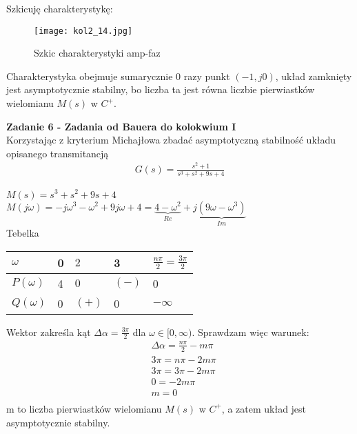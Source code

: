 \documentclass[a4paper,11pt]{article}
\begin{document}
Szkicuję charakterystykę:
\begin{figure}[H]
\centerline{\texttt{[image: kol2\_14.jpg]}}
\caption{Szkic charakterystyki amp-faz}
\label{fig:kol2_14}
\end{figure}
Charakterystyka obejmuje sumarycznie 0 razy punkt \( ( -1, j0 ) \), układ zamknięty jest asymptotycznie stabilny, bo liczba ta jest równa liczbie pierwiastków wielomianu \( M(s) \) w \( C^+ \).

\newpage
\begin{framed}
\textbf{Zadanie 6 - Zadania od Bauera do kolokwium I } \\ 
Korzystając z kryterium Michajłowa zbadać asymptotyczną stabilność układu opisanego transmitancją
\begin{align*}
G(s)=\frac{s^{2}+1}{s^{3}+s^{2}+9s+4}
\end{align*}
\end{framed}

$M(s)=s^3+s^2+9s+4$\\
$M(j\omega)=-j\omega^3-\omega^2+9j\omega+4=\underbrace{4-\omega^2}_{Re}+j\underbrace{(9\omega -\omega ^{3})}_{Im}$\\
Tebelka
\begin{table}[H]
\begin{center}
\begin{tabular}{|p{2cm}|p{2cm}|p{2cm}|p{2cm}|p{2cm}|}
\hline
\( \omega \) & 0 & \( 2 \) & 3 & \( \frac{n\pi}{2}=\frac{3\pi}{2} \) \\ \hline
\( P(\omega) \) & 4 & \( 0  \) & \( (-) \) &  0  \\ \hline
\( Q(\omega) \) & 0 & \( (+) \) & 0 & \( -\infty \)  \\ \hline
\end{tabular}
\end{center}
\end{table}

\begin{figure}[!h]
\end{figure}
Wektor zakreśla kąt \( \Delta \alpha = \frac{3\pi}{2} \) dla \( \omega \in [0, \infty ) \). Sprawdzam więc warunek:
\begin{align*}
&\Delta \alpha = \frac{n\pi}{2}-m\pi \\
&3\pi = n\pi-2m\pi \\
&3\pi =3\pi -2m\pi \\
& 0 = -2m\pi \\
& m = 0 \\
\end{align*}
m to liczba pierwiastków wielomianu \( M(s) \) w \( C^{+} \), a zatem układ jest asymptotycznie stabilny. 
\end{document}
